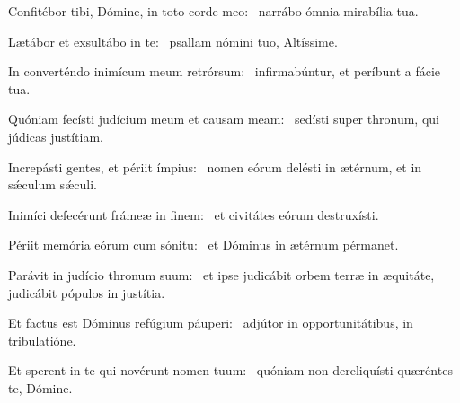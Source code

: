 \item Confitébor tibi, Dómine, in toto corde meo:~\psstar{} narrábo ómnia mirabília tua.
\item Lætábor et exsultábo in te:~\psstar{} psallam nómini tuo, Altíssime.
\item In converténdo inimícum meum retrórsum:~\psstar{} infirmabúntur, et períbunt a fácie tua.
\item Quóniam fecísti judícium meum et causam meam:~\psstar{} sedísti super thronum, qui júdicas justítiam.
\item Increpásti gentes, et périit ímpius:~\psstar{} nomen eórum delésti in ætérnum, et in sǽculum sǽculi.
\item Inimíci defecérunt frámeæ in finem:~\psstar{} et civitátes eórum destruxísti.
\item Périit memória eórum cum sónitu:~\psstar{} et Dóminus in ætérnum pérmanet.
\item Parávit in judício thronum suum:~\psstar{} et ipse judicábit orbem terræ in æquitáte, judicábit pópulos in justítia.
\item Et factus est Dóminus refúgium páuperi:~\psstar{} adjútor in opportunitátibus, in tribulatióne.
\item Et sperent in te qui novérunt nomen tuum:~\psstar{} quóniam non dereliquísti quæréntes te, Dómine.

